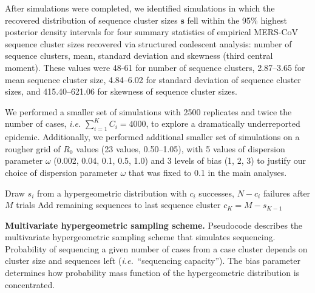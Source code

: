 \documentclass[9pt,lineno]{elife}
\begin{document}
After simulations were completed, we identified simulations in which the recovered distribution of sequence cluster sizes $\mathbf{s}$ fell within the 95\% highest posterior density intervals for four summary statistics of empirical MERS-CoV sequence cluster sizes recovered via structured coalescent analysis: number of sequence clusters, mean, standard deviation and skewness (third central moment).
These values were 48-61 for number of sequence clusters, 2.87--3.65 for mean sequence cluster size, 4.84--6.02 for standard deviation of sequence cluster sizes, and 415.40--621.06 for skewness of sequence cluster sizes.

We performed a smaller set of simulations with 2500 replicates and twice the number of cases, \textit{i.e.} $\sum_{i=1}^{K} C_{i} = 4000$, to explore a dramatically underreported epidemic.
Additionally, we performed additional smaller set of simulations on a rougher grid of $R_{0}$ values (23 values, 0.50--1.05), with 5 values of dispersion parameter $\omega$ (0.002, 0.04, 0.1, 0.5, 1.0) and 3 levels of bias (1, 2, 3) to justify our choice of dispersion parameter $\omega$ that was fixed to 0.1 in the main analyses.

\begin{algorithm}[H]
 Draw $s_i$ from a hypergeometric distribution with $c_i$ successes, $N-c_i$ failures after $M$ trials\;
 Add remaining sequences to last sequence cluster $c_K = M - s_{K-1}$\;
 \caption{\textbf{Multivariate hypergeometric sampling scheme.}
 Pseudocode describes the multivariate hypergeometric sampling scheme that simulates sequencing.
 Probability of sequencing a given number of cases from a case cluster depends on cluster size and sequences left (\textit{i.e.}\ ``sequencing capacity'').
 The bias parameter determines how probability mass function of the hypergeometric distribution is concentrated.
 }
 \label{hypergeometric}
\end{algorithm}
\end{document}
